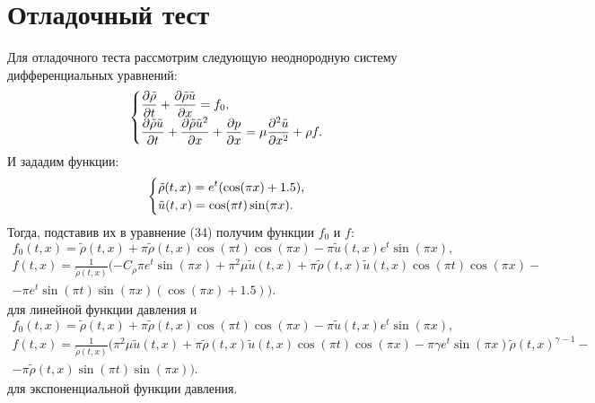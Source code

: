 \section{Отладочный тест}
Для отладочного теста рассмотрим следующую неоднородную систему дифференциальных уравнений:
\begin{equation}
	\begin{cases}
		$$
		\displaystyle\frac {\partial \tilde{\rho}} {\partial t} + \frac{\partial \tilde{\rho} \tilde{u}} {\partial x} = f_0,
		\\
		\displaystyle\frac {\partial \tilde{\rho} \tilde{u}} {\partial t} + \frac {\partial \tilde{\rho} \tilde{u}^2} {\partial x} + \frac {\partial p} {\partial x} = \mu \frac {\partial^2 \tilde{u}} {\partial x^2} + \rho f.
		$$
	\end{cases}
\end{equation}
И зададим функции:
\begin{equation}
	\begin{cases}
		$$
		\displaystyle \tilde{\rho} (t, x) = e^t (\cos (\pi x) + 1.5),
		\\
		\displaystyle\tilde{u} (t, x) = \cos (\pi t) \sin (\pi x).
		$$
	\end{cases}
\end{equation}
Тогда, подставив их в уравнение (34) получим функции $f_0$ и $f$:
\begin{equation}
	f_0 (t, x) = \tilde{\rho} (t, x) + \pi\tilde{\rho} (t, x) \cos (\pi t) \cos (\pi x) - \pi \tilde{u} (t, x) e^t \sin (\pi x),
\end{equation}
\begin{align}
	\displaystyle f (t, x) = \frac{1}{\tilde{\rho} (t, x)} (-C_{\rho} \pi e^t \sin (\pi x) + \pi^2 \mu \tilde{u} (t, x) + \pi \tilde{\rho} (t, x) \tilde{u} (t, x) \cos (\pi t) \cos (\pi x) - \\ - \pi e^t \sin (\pi t) \sin (\pi x) (\cos (\pi x) + 1.5)).
\end{align}
для линейной функции давления и
\begin{equation}
	f_0 (t, x) = \tilde{\rho} (t, x) + \pi\tilde{\rho} (t, x) \cos (\pi t) \cos (\pi x) - \pi \tilde{u} (t, x) e^t \sin (\pi x),
\end{equation}
\begin{align}
	\displaystyle f (t, x) = \frac{1}{\tilde{\rho} (t, x)} ( \pi^2 \mu \tilde{u} (t, x) + \pi \tilde{\rho} (t, x) \tilde{u} (t, x) \cos (\pi t) \cos (\pi x) - \pi \gamma e^t \sin (\pi x) \tilde{\rho} (t, x)^{\gamma - 1} - \\ - \pi \tilde{\rho} (t, x) \sin (\pi t) \sin (\pi x)).
\end{align}
для экспоненциальной функции давления.

